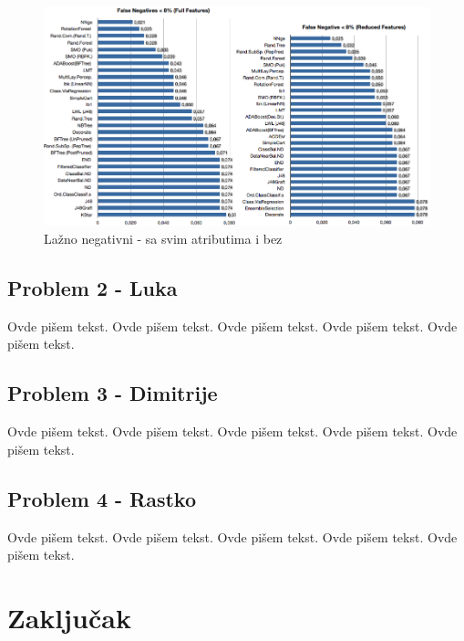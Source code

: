 \documentclass[a4paper]{article}
\begin{document}
\begin{figure}[h!]
\centering
\includegraphics[width=\textwidth]{false_negative.png}
\caption{Lažno negativni - sa svim atributima i bez}
\label{fig:falseNeg}
\end{figure}



\subsection{Problem 2 - Luka}

Ovde pišem tekst.
Ovde pišem tekst.
Ovde pišem tekst.
Ovde pišem tekst.
Ovde pišem tekst.



\subsection{Problem 3 - Dimitrije}

Ovde pišem tekst.
Ovde pišem tekst.
Ovde pišem tekst.
Ovde pišem tekst.
Ovde pišem tekst.



\subsection{Problem 4 - Rastko}

Ovde pišem tekst.
Ovde pišem tekst.
Ovde pišem tekst.
Ovde pišem tekst.
Ovde pišem tekst.



\section{Zaključak}
\label{sec:zakljucak}
\end{document}
